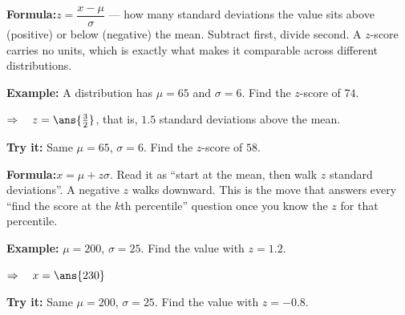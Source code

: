 \documentclass[12pt]{article}
\begin{document}


\begin{formulabox}
\textbf{Formula:}\quad $z = \dfrac{x - \mu}{\sigma}$ --- how many standard deviations the value
sits above (positive) or below (negative) the mean. Subtract first, divide second. A $z$-score
carries no units, which is exactly what makes it comparable across different distributions.
\end{formulabox}

\begin{examplebox}
\textbf{Example:} \quad A distribution has $\mu = 65$ and $\sigma = 6$. Find the $z$-score of $74$.

$\Rightarrow\quad z = \ans{\tfrac{3}{2}}$, that is, $1.5$ standard deviations above the mean.
\end{examplebox}

\begin{tryitbox}
\textbf{Try it:} \quad Same $\mu = 65$, $\sigma = 6$. Find the $z$-score of $58$.\\[2pt]
\end{tryitbox}


\begin{formulabox}
\textbf{Formula:}\quad $x = \mu + z\sigma$. Read it as ``start at the mean, then walk $z$
standard deviations''. A negative $z$ walks downward. This is the move that answers every
``find the score at the $k$th percentile'' question once you know the $z$ for that percentile.
\end{formulabox}

\begin{examplebox}
\textbf{Example:} \quad $\mu = 200$, $\sigma = 25$. Find the value with $z = 1.2$.

$\Rightarrow\quad x = \ans{230}$
\end{examplebox}

\begin{tryitbox}
\textbf{Try it:} \quad Same $\mu = 200$, $\sigma = 25$. Find the value with $z = -0.8$.\\[2pt]
\end{tryitbox}
\end{document}
